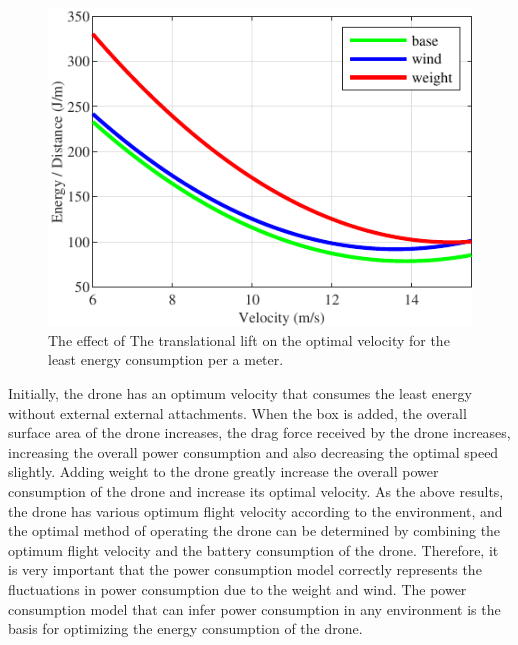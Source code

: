 \documentclass[journal]{./template/IEEEtran}
\begin{document}
\begin{figure}[ht]
\centering\includegraphics[scale=1.05]{fig10/t_lift.pdf}
\caption{The effect of The translational lift on the optimal velocity for the least energy consumption per a meter.}
\label{fig: lift}
\end{figure}

Initially, the drone has an optimum velocity that consumes the least energy without external external attachments. 
When the box is added, the overall surface area of the drone increases, the drag force received by the drone increases, increasing the overall power consumption and also decreasing the optimal speed slightly. 
Adding weight to the drone greatly increase the overall power consumption of the drone and increase its optimal velocity.
As the above results, the drone has various optimum flight velocity according to the environment, and the optimal method of operating the drone can be determined by combining the optimum flight velocity and the battery consumption of the drone. 
Therefore, it is very important that the power consumption model correctly represents the fluctuations in power consumption due to the weight and wind. 
The power consumption model that can infer power consumption in any environment is the basis for optimizing the energy consumption of the drone.

\end{document}
